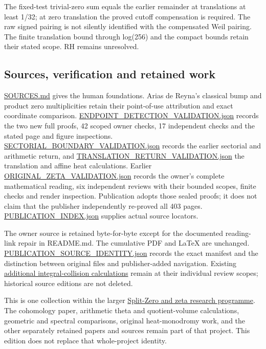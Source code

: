 \documentclass[
]{article}
\begin{document}
The fixed-test trivial-zero sum equals the earlier remainder at
translations at least 1/32; at zero translation the proved cutoff
compensation is required. The raw signed pairing is not silently
identified with the compensated Weil pairing. The finite translation
bound through log(256) and the compact bounds retain their stated scope.
RH remains unresolved.

\subsection{Sources, verification and retained
work}\label{sources-verification-and-retained-work}

\url{SOURCES.md} gives the human foundations. Arias de Reyna's classical
bump and product zero multiplicities retain their point-of-use
attribution and exact coordinate comparison.
\url{ENDPOINT_DETECTION_VALIDATION.json} records the two new full
proofs, 42 scoped owner checks, 17 independent checks and the stated
page and figure inspections. \url{SECTORIAL_BOUNDARY_VALIDATION.json}
records the earlier sectorial and arithmetic return, and
\url{TRANSLATION_RETURN_VALIDATION.json} the translation and affine heat
calculations. Earlier \url{ORIGINAL_ZETA_VALIDATION.json} records the
owner's complete mathematical reading, six independent reviews with
their bounded scopes, finite checks and render inspection. Publication
adopts those sealed proofs; it does not claim that the publisher
independently re-proved all 403 pages. \url{PUBLICATION_INDEX.json}
supplies actual source locators.

The owner source is retained byte-for-byte except for the documented
reading-link repair in README.md. The cumulative PDF and LaTeX are
unchanged. \url{PUBLICATION_SOURCE_IDENTITY.json} records the exact
manifest and the distinction between original files and publisher-added
navigation. Existing \href{research_calculations/README.md}{additional
integral-collision calculations} remain at their individual review
scopes; historical source editions are not deleted.

This is one collection within the larger
\href{https://github.com/KokunoYumeto/zeta-function-research-reader}{Split-Zero
and zeta research programme}. The cohomology paper, arithmetic theta and
quotient-volume calculations, geometric and spectral comparisons,
original heat-monodromy work, and the other separately retained papers
and sources remain part of that project. This edition does not replace
that whole-project identity.
\end{document}
